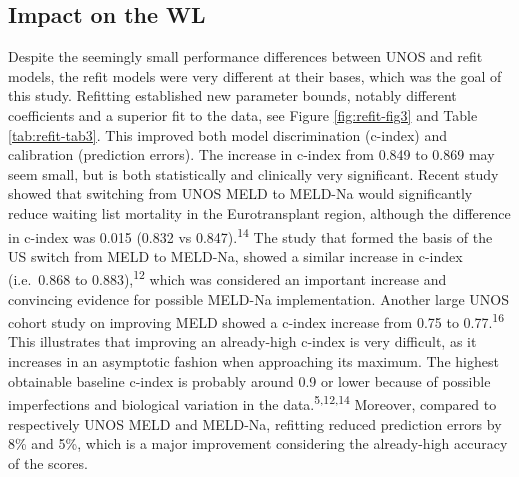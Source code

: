 \documentclass[11pt,english,]{book} %
\begin{document}
\hypertarget{impact-on-the-wl}{%
\subsection*{Impact on the WL}\label{impact-on-the-wl}}

Despite the seemingly small performance differences between UNOS and refit models, the refit models were very different at their bases, which was the goal of this study. Refitting established new parameter bounds, notably different coefficients and a superior fit to the data, see Figure \ref{fig:refit-fig3} and Table \ref{tab:refit-tab3}. This improved both model discrimination (c-index) and calibration (prediction errors). The increase in c-index from 0.849 to 0.869 may seem small, but is both statistically and clinically very significant. Recent study showed that switching from UNOS MELD to MELD-Na would significantly reduce waiting list mortality in the Eurotransplant region, although the difference in c-index was 0.015 (0.832 vs 0.847).\textsuperscript{14} The study that formed the basis of the US switch from MELD to MELD-Na, showed a similar increase in c-index (i.e.~0.868 to 0.883),\textsuperscript{12} which was considered an important increase and convincing evidence for possible MELD-Na implementation. Another large UNOS cohort study on improving MELD showed a c-index increase from 0.75 to 0.77.\textsuperscript{16} This illustrates that improving an already-high c-index is very difficult, as it increases in an asymptotic fashion when approaching its maximum. The highest obtainable baseline c-index is probably around 0.9 or lower because of possible imperfections and biological variation in the data.\textsuperscript{5,12,14} Moreover, compared to respectively UNOS MELD and MELD-Na, refitting reduced prediction errors by 8\% and 5\%, which is a major improvement considering the already-high accuracy of the scores.
\end{document}
